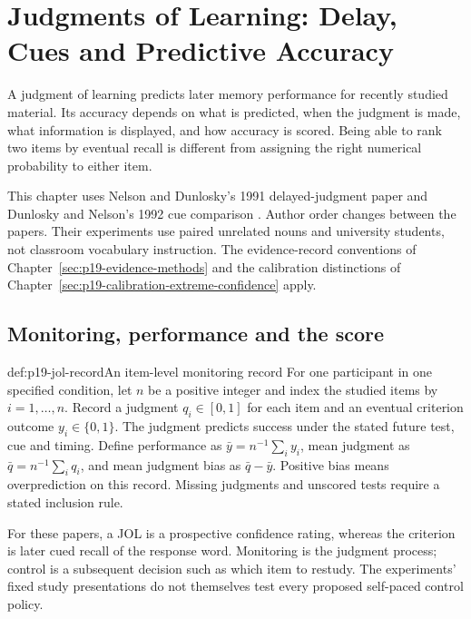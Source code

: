 \chapter{Judgments of Learning: Delay, Cues and Predictive Accuracy}
\label{sec:p19-judgments-of-learning}

A judgment of learning predicts later memory performance for recently
studied material. Its accuracy depends on what is predicted, when the
judgment is made, what information is displayed, and how accuracy is
scored. Being able to rank two items by eventual recall is different
from assigning the right numerical probability to either item.

This chapter uses Nelson and Dunlosky's 1991 delayed-judgment paper
\cite{NelsonDunlosky1991DelayedJOL} and Dunlosky and Nelson's 1992
cue comparison \cite{DunloskyNelson1992CueJOL}. Author order changes
between the papers. Their experiments use paired unrelated nouns and
university students, not classroom vocabulary instruction.
The evidence-record conventions of
Chapter~\ref{sec:p19-evidence-methods} and the calibration distinctions
of Chapter~\ref{sec:p19-calibration-extreme-confidence} apply.

\section{Monitoring, performance and the score}

\begin{hbdefinition}{def:p19-jol-record}{An item-level monitoring record}
For one participant in one specified condition, let \(n\) be a positive
integer and index the studied items by \(i=1,\ldots,n\).
Record a judgment \(q_i\in[0,1]\) for each item and an eventual
criterion outcome \(y_i\in\{0,1\}\). The judgment predicts success
under the stated future test, cue and timing. Define performance
as \(\bar y=n^{-1}\sum_i y_i\), mean judgment as
\(\bar q=n^{-1}\sum_iq_i\), and mean judgment bias as
\(\bar q-\bar y\). Positive bias means overprediction on this record.
Missing judgments and unscored tests require a stated inclusion rule.

For these papers, a JOL is a prospective confidence rating, whereas
the criterion is later cued recall of the response word. Monitoring
is the judgment process; control is a subsequent decision such as
which item to restudy. The experiments' fixed study presentations
do not themselves test every proposed self-paced control policy.
\end{hbdefinition}

